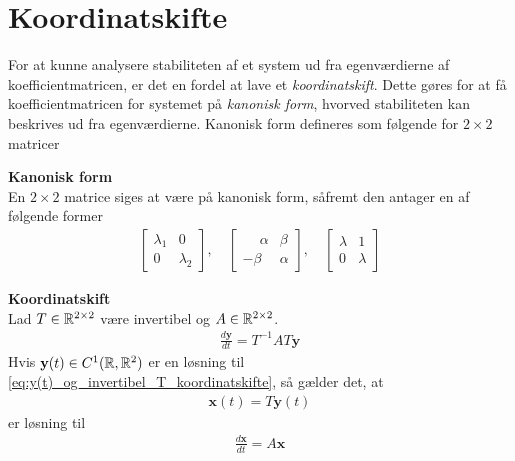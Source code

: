 \section{Koordinatskifte}

For at kunne analysere stabiliteten af et system ud fra egenværdierne af koefficientmatricen, er det en fordel at lave et \textit{koordinatskift}. Dette gøres for at få koefficientmatricen for systemet på \textit{kanonisk form}, hvorved stabiliteten kan beskrives ud fra egenværdierne.
Kanonisk form defineres som følgende for $2\times 2$ matricer
\begin{defn}\textbf{Kanonisk form}\\
    En $2\times 2$ matrice siges at være på kanonisk form, såfremt den antager en af følgende former
%    
    \begin{align*}
        \begin{bmatrix}
            \lambda_1   &  0\\
            0           &  \lambda_2
        \end{bmatrix}, \quad
        \begin{bmatrix}
            \phantom{-}\alpha & \beta \\
            -\beta & \alpha
        \end{bmatrix}, \quad
        \begin{bmatrix}
            \lambda & 1\\
            0       & \lambda
        \end{bmatrix}
    \end{align*}
\end{defn}

\begin{thmx}\textbf{Koordinatskift}\\
Lad $T\in\mathbb{R}^{2\times 2}$ være invertibel og $A\in \mathbb{R}^{2\times 2}$.
%
\begin{align}\label{eq:y(t)_og_invertibel_T_koordinatskifte}
    \frac{d\textbf{y}}{dt} = T^{-1}AT \textbf{y}
\end{align}
%
Hvis $\textbf{y}(t)\in C^1(\mathbb{R}, \mathbb{R}^2)$ er en løsning til \eqref{eq:y(t)_og_invertibel_T_koordinatskifte}, så gælder det, at 
\begin{align}\label{eq:x(t)_koordinatskifte}
    \textbf{x}(t)=T\textbf{y}(t)
\end{align}
%
er løsning til %
%
\begin{align}\label{eq:x'(t)=Ax_koordinatskifte}
    \displaystyle \frac{d\textbf{x}}{dt}= A\textbf{x}
\end{align}


\end{thmx}

